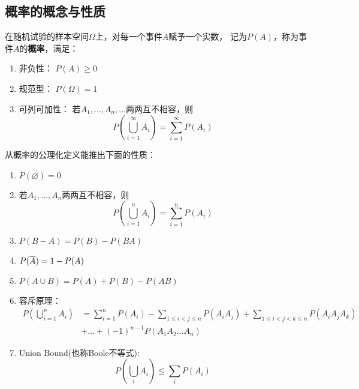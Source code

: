 \subsection{概率的概念与性质}
\begin{definition}[概率]
  在随机试验的样本空间$\Omega$上，对每一个事件$A$赋予一个实数，
  记为$P(A)$，称为事件$A$的\textbf{概率}，满足：
  \begin{enumerate}
    \item 非负性：
    $P(A)\ge 0$
    \item 规范型：
    $P(\Omega) = 1$
    \item 可列可加性：
    若$A_1,\dots,A_n,\dots$两两互不相容，则
    \begin{displaymath}
      P\left(\bigcup_{i=1}^\infty A_i\right)=\sum_{i=1}^\infty P(A_i)
    \end{displaymath}
  \end{enumerate}
\end{definition}

\begin{theorem}[概率的性质]
  从概率的公理化定义能推出下面的性质：
  \begin{enumerate}
    \item
    $P(\varnothing) = 0$
    \item
    若$A_1,\dots,A_n$两两互不相容，则
    \begin{displaymath}
    P\left(\bigcup_{i=1}^n A_i\right)=\sum_{i=1}^n P(A_i)
    \end{displaymath}
    \item
    $P(B-A) = P(B) - P(BA)$
    \item
    $P(\overline{A}) = 1 - P(A)$
    \item
    $P(A\cup B) = P(A) + P(B) - P(AB)$
    \item
    容斥原理：
    \begin{align*}
      P\left(\bigcup_{i=1}^n A_i\right)
      &= \sum_{i=1}^n P(A_i) - \sum_{1\le i<j\le n} P(A_iA_j)
      + \sum_{1\le i<j<k\le n} P(A_iA_jA_k) \\
      &+ \dots + (-1)^{n-1}P(A_1A_2\dots A_n)
    \end{align*}
    \item
    Union Bound(也称Boole不等式):
    \begin{displaymath}
      P\left(\bigcup_i A_i\right) \le \sum_i P(A_i)
    \end{displaymath}
  \end{enumerate}
\end{theorem}

